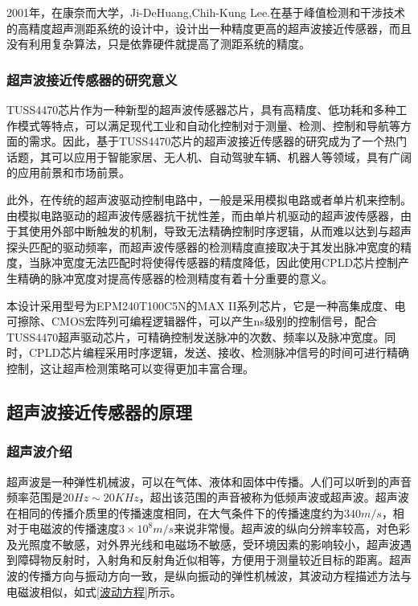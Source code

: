 	2001年，在康奈而大学，Ji-DeHuang,Chih-Kung Lee.在基于峰值检测和干涉技术的高精度超声测距系统的设计中，设计出一种精度更高的超声波接近传感器，而且没有利用复杂算法，只是依靠硬件就提高了测距系统的精度。
	
    
    \subsubsection{超声波接近传感器的研究意义}
    TUSS4470芯片作为一种新型的超声波传感器芯片，具有高精度、低功耗和多种工作模式等特点，可以满足现代工业和自动化控制对于测量、检测、控制和导航等方面的需求。因此，基于TUSS4470芯片的超声波接近传感器的研究成为了一个热门话题，其可以应用于智能家居、无人机、自动驾驶车辆、机器人等领域，具有广阔的应用前景和市场前景。\par
    此外，在传统的超声波驱动控制电路中，一般是采用模拟电路或者单片机来控制。由模拟电路驱动的超声波传感器抗干扰性差，而由单片机驱动的超声波传感器，由于其使用外部中断触发的机制，导致无法精确控制时序逻辑，从而难以达到与超声探头匹配的驱动频率，而超声波传感器的检测精度直接取决于其发出脉冲宽度的精度，当脉冲宽度无法匹配时将使得传感器的精度降低，因此使用CPLD芯片控制产生精确的脉冲宽度对提高传感器的检测精度有着十分重要的意义。\par
    本设计采用型号为EPM240T100C5N的MAX II系列芯片，它是一种高集成度、电可擦除、CMOS宏阵列可编程逻辑器件，可以产生ns级别的控制信号，配合TUSS4470超声驱动芯片，可精确控制发送脉冲的次数、频率以及脉冲宽度。同时，CPLD芯片编程采用时序逻辑，发送、接收、检测脉冲信号的时间可进行精确控制，这让超声检测策略可以变得更加丰富合理。
    \subsection{超声波接近传感器的原理}
    \subsubsection{超声波介绍}
      超声波是一种弹性机械波，可以在气体、液体和固体中传播。人们可以听到的声音频率范围是$20Hz\sim20KHz$，超出该范围的声音被称为低频声波或超声波。超声波在相同的传播介质里的传播速度相同，在大气条件下的传播速度约为$340m/s$，相对于电磁波的传播速度$3\times10^8m/s$来说非常慢。超声波的纵向分辨率较高，对色彩及光照度不敏感，对外界光线和电磁场不敏感，受环境因素的影响较小，超声波遇到障碍物反射时，入射角和反射角近似相等，方便用于测量较近目标的距离。超声波的传播方向与振动方向一致，是纵向振动的弹性机械波，其波动方程描述方法与电磁波相似，如式\ref{波动方程}所示。

